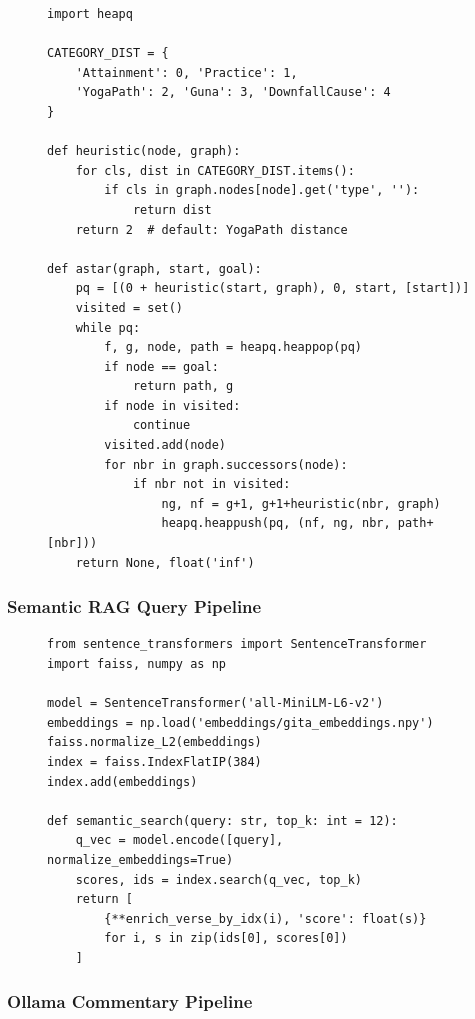 \documentclass[conference]{IEEEtran}
\begin{document}
\begin{figure}[!t]
\begin{lstlisting}[language=Python3, caption={A* search with philosophical heuristic}]
import heapq

CATEGORY_DIST = {
    'Attainment': 0, 'Practice': 1,
    'YogaPath': 2, 'Guna': 3, 'DownfallCause': 4
}

def heuristic(node, graph):
    for cls, dist in CATEGORY_DIST.items():
        if cls in graph.nodes[node].get('type', ''):
            return dist
    return 2  # default: YogaPath distance

def astar(graph, start, goal):
    pq = [(0 + heuristic(start, graph), 0, start, [start])]
    visited = set()
    while pq:
        f, g, node, path = heapq.heappop(pq)
        if node == goal:
            return path, g
        if node in visited:
            continue
        visited.add(node)
        for nbr in graph.successors(node):
            if nbr not in visited:
                ng, nf = g+1, g+1+heuristic(nbr, graph)
                heapq.heappush(pq, (nf, ng, nbr, path+[nbr]))
    return None, float('inf')
\end{lstlisting}
\end{figure}

\subsubsection{Semantic RAG Query Pipeline}

\begin{figure}[!t]
\begin{lstlisting}[language=Python3, caption={Semantic search: encode, index, retrieve}]
from sentence_transformers import SentenceTransformer
import faiss, numpy as np

model = SentenceTransformer('all-MiniLM-L6-v2')
embeddings = np.load('embeddings/gita_embeddings.npy')
faiss.normalize_L2(embeddings)
index = faiss.IndexFlatIP(384)
index.add(embeddings)

def semantic_search(query: str, top_k: int = 12):
    q_vec = model.encode([query], normalize_embeddings=True)
    scores, ids = index.search(q_vec, top_k)
    return [
        {**enrich_verse_by_idx(i), 'score': float(s)}
        for i, s in zip(ids[0], scores[0])
    ]
\end{lstlisting}
\end{figure}

\subsubsection{Ollama Commentary Pipeline}
\end{document}
